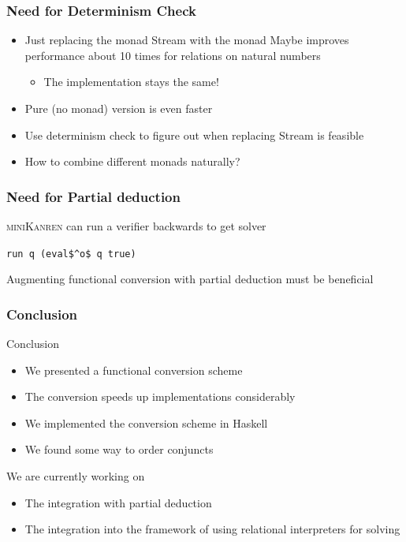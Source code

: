 \documentclass[xcolor=table]{beamer}
\newcommand{\mk}{\textsc{miniKanren}\xspace}
\begin{document}
\begin{frame}[fragile]
  \frametitle{Need for Determinism Check}
  \begin{itemize}
    \item Just replacing the monad Stream with the monad Maybe improves performance about 10 times for relations on natural numbers
    \begin{itemize}
      \item The implementation stays the same!
    \end{itemize}
    \item Pure (no monad) version is even faster
    \item Use determinism check to figure out when replacing Stream is feasible
    \item How to combine different monads naturally?
  \end{itemize}
\end{frame}

\begin{frame}[fragile]
  \frametitle{Need for Partial deduction}

\begin{center}
\mk can run a verifier backwards to get solver
\end{center}

\begin{center}
\begin{minipage}{0.3\textwidth}
  \lstinline{run q (eval$^o$ q true)}
\end{minipage}

\begin{center}
  Augmenting functional conversion with partial deduction must be beneficial
\end{center}
\end{center}


\end{frame}


\begin{frame}[fragile]
  \frametitle{Conclusion}
Conclusion
  \begin{itemize}
    \item We presented a functional conversion scheme
    \item The conversion speeds up implementations considerably
    \item We implemented the conversion scheme in Haskell
    \item We found some way to order conjuncts
  \end{itemize}

\vfill

We are currently working on
  \begin{itemize}
    \item The integration with partial deduction
    \item The integration into the framework of using relational interpreters for solving
  \end{itemize}
\end{frame}
\end{document}
